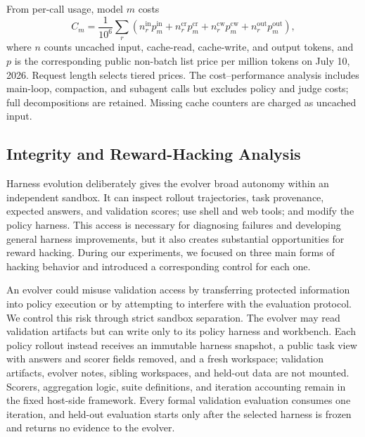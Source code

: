 From per-call usage, model $m$ costs
\begin{equation*}
C_m=\frac{1}{10^6}\sum_r
\left(n^{\mathrm{in}}_r p^{\mathrm{in}}_m
+n^{\mathrm{cr}}_r p^{\mathrm{cr}}_m
+n^{\mathrm{cw}}_r p^{\mathrm{cw}}_m
+n^{\mathrm{out}}_r p^{\mathrm{out}}_m\right),
\end{equation*}
where $n$ counts uncached input, cache-read, cache-write, and output tokens, and
$p$ is the corresponding public non-batch list price per million tokens on July
10, 2026.  Request length selects tiered prices.  The cost--performance analysis
includes main-loop, compaction, and subagent calls but excludes policy and judge
costs; full decompositions are retained.  Missing cache counters are charged as
uncached input.

\subsection{Integrity and Reward-Hacking Analysis}
\label{app:integrity-analysis}

Harness evolution deliberately gives the evolver broad autonomy within an independent sandbox.  It can inspect rollout trajectories, task provenance, expected answers, and validation scores; use shell and web tools; and modify the policy harness.  This access is necessary for diagnosing failures and developing general harness improvements, but it also creates substantial opportunities for reward hacking.  During our experiments, we focused on three main forms of hacking behavior and introduced a corresponding control for each one.

An evolver could misuse validation access by transferring protected information into policy execution or by attempting to interfere with the evaluation protocol.  We control this risk through strict sandbox separation.  The evolver may read validation artifacts but can write only to its policy harness and workbench.  Each policy rollout instead receives an immutable harness snapshot, a public task view with answers and scorer fields removed, and a fresh workspace; validation artifacts, evolver notes, sibling workspaces, and held-out data are not mounted.  Scorers, aggregation logic, suite definitions, and iteration accounting remain in the fixed host-side framework.  Every formal validation evaluation consumes one iteration, and held-out evaluation starts only after the selected harness is frozen and returns no evidence to the evolver.

